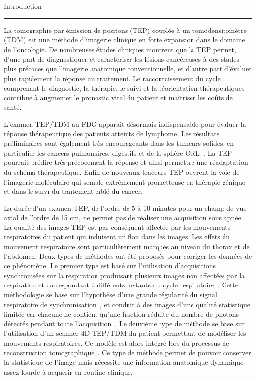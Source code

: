 
{\fontsize{30}{100}\selectfont Introduction}

\rule{15cm}{0.1em}

\vspace{1cm}
\pagestyle{plain}

La tomographie par émission de positons (TEP) couplée à un tomodensitomètre (TDM) est une méthode d’imagerie clinique en forte expansion dans le domaine de l’oncologie. De nombreuses études cliniques montrent que la TEP permet, d’une part de diagnostiquer et caractériser les lésions cancéreuses à des stades plus précoces que l’imagerie anatomique conventionnelle, et d’autre part d’évaluer plus rapidement la réponse au traitement. Le raccourcissement du cycle comprenant le diagnostic, la thérapie, le suivi et la réorientation thérapeutiques contribue à augmenter le pronostic vital du patient et maîtriser les coûts de santé.

L’examen TEP/TDM au FDG apparaît désormais indispensable pour évaluer la réponse thérapeutique des patients atteints de lymphome. Les résultats préliminaires sont également très encourageants dans les tumeurs solides, en particulier les cancers pulmonaires, digestifs et de la sphère ORL~\cite{cachin2006evaluation}. La TEP pourrait prédire très précocement la réponse et ainsi permettre une réadaptation du schéma thérapeutique. Enfin de nouveaux traceurs TEP ouvrent la voie de l’imagerie moléculaire qui semble extrêmement prometteuse en thérapie génique et dans le suivi du traitement ciblé du cancer.

La durée d’un examen TEP, de l’ordre de 5 à 10 minutes pour un champ de vue axial de l’ordre de 15 cm, ne permet pas de réaliser une acquisition sous apnée. La qualité des images TEP est par conséquent affectée par les mouvements respiratoires du patient qui induisent un flou dans les images. Les effets du mouvement respiratoire sont particulièrement marqués au niveau du thorax et de l’abdomen. Deux types de méthodes ont été proposés pour corriger les données de ce phénomène. Le premier type est basé sur l’utilisation d’acquisitions synchronisées sur la respiration produisant plusieurs images non affectées par la respiration et correspondant à différents instants du cycle respiratoire~\cite{nehmeh2002effect}\cite{boucher2004respiratory}. Cette méthodologie se base sur l’hypothèse  d’une grande régularité du signal respiratoire de synchronisation~\cite{boucher2004respiratory}, et conduit à des images d’une qualité statistique limitée car chacune ne contient qu'une fraction réduite du nombre de photons détectés pendant toute l’acquisition~\cite{visvikis2004evaluation}. Le deuxième type de méthode se base sur l’utilisation d’un scanner 4D TEP/TDM du patient permettant de modéliser les mouvements respiratoires. Ce modèle est alors intégré lors du processus de reconstruction tomographique~\cite{lamare2007list}. Ce type de méthode permet de pouvoir conserver la statistique de l’image mais nécessite une information anatomique dynamique assez lourde à acquérir en routine clinique.

